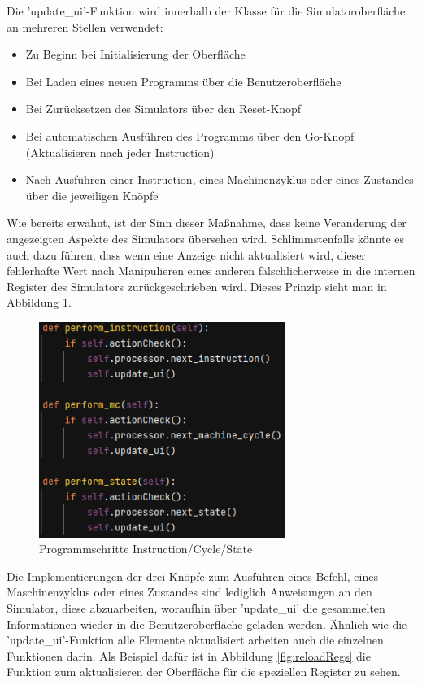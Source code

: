 \documentclass[12pt]{article}
\newcommand{\imgSpaceBefore}{\vspace{10pt}}
\begin{document}
\noindent
Die 'update\_ui'-Funktion wird innerhalb der Klasse für die Simulatoroberfläche an mehreren Stellen verwendet:\imgSpaceBefore

\begin{itemize}
	\item Zu Beginn bei Initialisierung der Oberfläche
	\item Bei Laden eines neuen Programms über die Benutzeroberfläche
	\item Bei Zurücksetzen des Simulators über den Reset-Knopf
	\item Bei automatischen Ausführen des Programms über den Go-Knopf (Aktualisieren nach jeder Instruction)
	\item Nach Ausführen einer Instruction, eines Machinenzyklus oder eines Zustandes über die jeweiligen Knöpfe
\end{itemize}

\noindent
Wie bereits erwähnt, ist der Sinn dieser Maßnahme, dass keine Veränderung der angezeigten Aspekte des Simulators übersehen wird. Schlimmstenfalls könnte es auch dazu führen, dass wenn eine Anzeige nicht aktualisiert wird, dieser fehlerhafte Wert nach Manipulieren eines anderen fälschlicherweise in die internen Register des Simulators zurückgeschrieben wird. Dieses Prinzip sieht man in Abbildung \ref{fig:perf}.\imgSpaceBefore

\begin{figure}[H]
\centering
\includegraphics[width=8cm]{bilder/Perform}
\caption{Programmschritte Instruction/Cycle/State}
\label{fig:perf}
\end{figure}

\noindent
Die Implementierungen der drei Knöpfe zum Ausführen eines Befehl, eines Maschinenzyklus oder eines Zustandes sind lediglich Anweisungen an den Simulator, diese abzuarbeiten, woraufhin über 'update\_ui' die gesammelten Informationen wieder in die Benutzeroberfläche geladen werden. Ähnlich wie die 'update\_ui'-Funktion alle Elemente aktualisiert arbeiten auch die einzelnen Funktionen darin. Als Beispiel dafür ist in Abbildung \ref{fig:reloadRegs} die Funktion zum aktualisieren der Oberfläche für die speziellen Register zu sehen.\imgSpaceBefore
\end{document}

